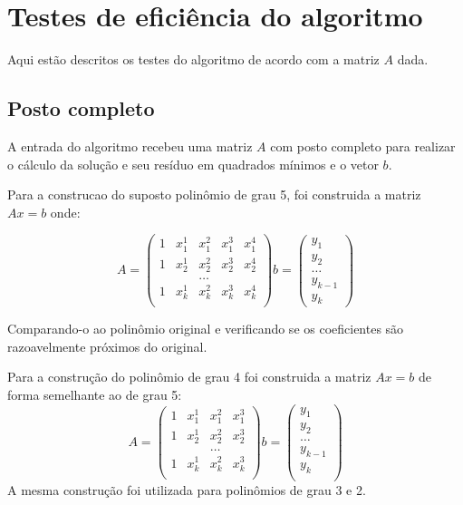 \chapter{Testes de eficiência do algoritmo}
Aqui estão descritos os testes do algoritmo de acordo com a matriz $A$ dada.

\section{Posto completo}
A entrada do algoritmo recebeu uma matriz $A$ com posto completo para realizar
o cálculo da solução e seu resíduo em quadrados mínimos e o vetor $b$.

Para a construcao do suposto polinômio de grau 5, foi construida a matriz $Ax = b$
onde:

\[
A =	\left(
\begin{array}{ccccc} 
1&	x_1^1&	x_1^2&	x_1^3&	x_1^4\\
1&	x_2^1&	x_2^2&	x_2^3&	x_2^4\\
&&\ldots\\
1&	x_k^1&	x_k^2&	x_k^3&	x_k^4\\
\end{array}
\right)
b =   
\left(
\begin{array}{c}
y_1\\
y_2\\
\ldots\\
y_{k-1}\\
y_k 
\end{array}    
\right)
\]

Comparando-o ao polinômio original e verificando se os coeficientes 
são razoavelmente próximos do original.


Para a construção do polinômio de grau 4 foi construida a matriz $Ax = b$ de forma
semelhante ao de grau 5:
\[A =	
\left(
\begin{array}{cccc}
1 &	x_1^1 &	x_1^2 &	x_1^3\\
1 &	x_2^1 &	x_2^2 &	x_2^3\\
&&\dots          \\
1 &	x_k^1 &	x_k^2 &	x_k^3\\
\end{array} 
\right)
b =  
\left(
\begin{array}{c}
y_1\\
y_2\\
\ldots\\
y_{k-1}\\
y_k\\ 
\end{array}   
\right)
\]
A mesma construção foi utilizada para polinômios de grau 3 e 2.


